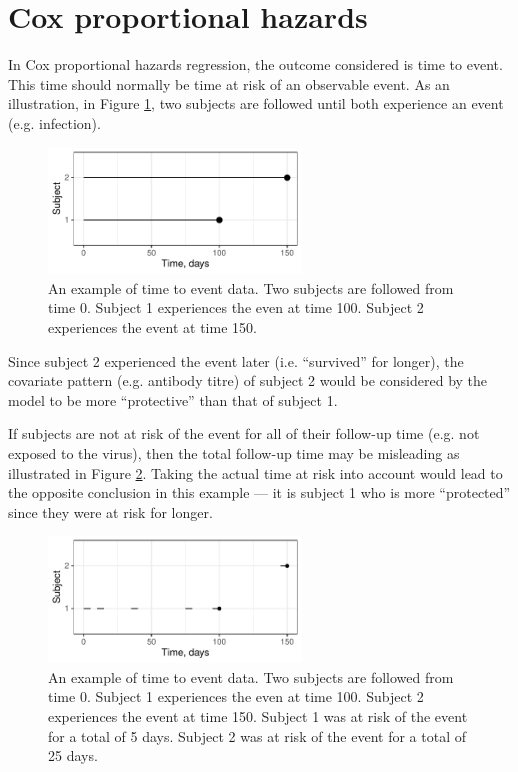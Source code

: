 \documentclass[12pt]{article}
\begin{document}
\pagebreak
\section{Cox proportional hazards}

In Cox proportional hazards regression, the outcome considered is time to event. This time should normally be time at risk of an observable event. As an illustration, in Figure \ref{CoxExampleFull}, two subjects are followed until both experience an event (e.g. infection).

\begin{figure}[htp]
	\centering
	\includegraphics[width=0.6\textwidth]{../curve-cox/timeplot_1_light.pdf}
	\caption{
	An example of time to event data. Two subjects are followed from time 0. Subject 1 experiences the even at time 100. Subject 2 experiences the event at time 150.
	}
	\label{CoxExampleFull}
\end{figure}

Since subject 2 experienced the event later (i.e. ``survived'' for longer), the covariate pattern (e.g. antibody titre) of subject 2 would be considered by the model to be more ``protective'' than that of subject 1.

If subjects are not at risk of the event for all of their follow-up time (e.g. not exposed to the virus), then the total follow-up time may be misleading as illustrated in Figure \ref{CoxExamplePartial}. Taking the actual time at risk into account would lead to the opposite conclusion in this example --- it is subject 1 who is more ``protected'' since they were at risk for longer.

\begin{figure}[htp]
	\centering
	\includegraphics[width=0.6\textwidth]{../curve-cox/timeplot_2_light.pdf}
	\caption{
	An example of time to event data. Two subjects are followed from time 0. Subject 1 experiences the even at time 100. Subject 2 experiences the event at time 150. Subject 1 was at risk of the event for a total of 5 days. Subject 2 was at risk of the event for a total of 25 days.
	}
	\label{CoxExamplePartial}
\end{figure}
\end{document}
